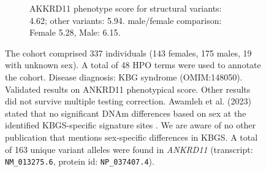 \begin{figure}[htbp]
\vspace{2em}

\begin{subfigure}[b]{0.95\textwidth}
\captionsetup{justification=raggedright,singlelinecheck=false}
\caption{AKKRD11 phenotype score for structural variants: 4.62; other variants: 5.94. male/female comparison: Female 5.28, Male: 6.15.}
\end{subfigure}

\vspace{2em}

\caption{The cohort comprised 337 individuals (143 females, 175 males, 19 with unknown sex). A total of 48 HPO terms were used to annotate the cohort. Disease diagnosis: KBG syndrome (OMIM:148050). Validated results on ANKRD11 phenotypical score. Other results did not survive multiple testing correction. Awamleh et al. (2023) stated that no significant DNAm differences based on sex at the identified KBGS-specific signature sites \cite{PMID_36440975}. We are aware of no other publication that mentions sex-specific differences in KBGS. A total of 163 unique variant alleles were found in \textit{ANKRD11} (transcript: \texttt{NM\_013275.6}, protein id: \texttt{NP\_037407.4}).}
\end{figure}
